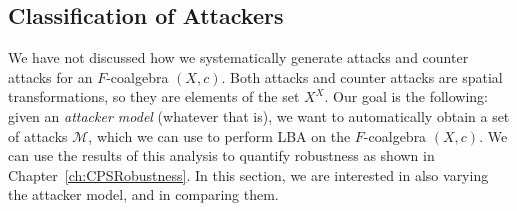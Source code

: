 \subsection{Classification of Attackers}
We have not discussed how we systematically generate attacks and counter attacks for an $F$-coalgebra $(X,c)$. Both attacks and counter attacks are spatial transformations, so they are elements of the set $X^X$. %
Our goal is the following: given an \emph{attacker model} (whatever that is), we want to automatically obtain a set of attacks $\mathcal{M}$, which we can use to perform LBA on the $F$-coalgebra $(X,c)$. We can use the results of this analysis to quantify robustness as shown in Chapter~\ref{ch:CPSRobustness}. In this section, we are interested in also varying the attacker model, and in comparing them.

